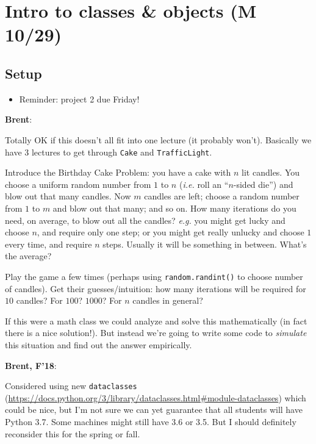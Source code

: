 \documentclass{article}
\newenvironment{reflect}[1]
{
  \noindent
  \begin{lrbox}{\reflectbox}
    \begin{minipage}[t]{\textwidth}
      \textbf{#1}:
}{
    \end{minipage}
  \end{lrbox}
  \fbox{\usebox{\reflectbox}}
}
\newcommand{\notready}{\textcolor{red}{\XSolidBold}\xspace}
\begin{document}
\newpage
\section{\notready Intro to classes \& objects (M 10/29)}

\subsection*{Setup}

\begin{itemize}
\item Reminder: project 2 due Friday!
\end{itemize}

\begin{reflect}{Brent}
  Totally OK if this doesn't all fit into one lecture (it probably
  won't).  Basically we have 3 lectures to get through \verb|Cake| and
  \verb|TrafficLight|.
\end{reflect}

Introduce the Birthday Cake Problem: you have a cake with $n$ lit
candles.  You choose a uniform random number from $1$ to $n$
(\emph{i.e.} roll an ``$n$-sided die'') and blow out that many
candles.  Now $m$ candles are left; choose a random number from $1$ to
$m$ and blow out that many; and so on.  How many iterations do you
need, on average, to blow out all the candles?  \emph{e.g.} you might
get lucky and choose $n$, and require only one step; or you might get
really unlucky and choose $1$ every time, and require $n$ steps.
Usually it will be something in between.  What's the average?

Play the game a few times (perhaps using \verb|random.randint()| to
choose number of candles).  Get their guesses/intuition: how many
iterations will be required for $10$ candles? For $100$? $1000$? For
$n$ candles in general?

If this were a math class we could analyze and solve this
mathematically (in fact there is a nice solution!).  But instead we're
going to write some code to \emph{simulate} this situation and find
out the answer empirically.

\begin{reflect}{Brent, F'18}
  Considered using new \verb|dataclasses|
  (\url{https://docs.python.org/3/library/dataclasses.html#module-dataclasses})
  which could be nice, but I'm not sure we can yet guarantee that all
  students will have Python 3.7.  Some machines might still have 3.6
  or 3.5.  But I should definitely reconsider this for the spring or
  fall.
\end{reflect}
\end{document}
